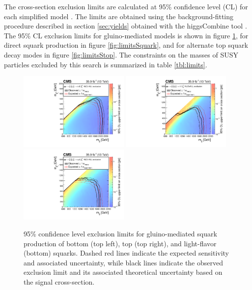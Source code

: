 The cross-section exclusion limits are calculated at 95\% confidence level (CL) for each simplified model \cite{0954-3899-28-10-313, Junk:1999kv, Cowan:2010js}. The limits are obtained using the background-fitting procedure described in section \ref{sec:yields} obtained with the higgsCombine tool \cite{CMS-NOTE-2011-005}. The 95\% CL exclusion limits for gluino-mediated models is shown in figure \ref{fig:limitsGluino}, for direct squark production in figure \ref{fig:limitsSquark}, and for alternate top squark decay modes in figure \ref{fig:limitsStop}. The constraints on the masses of SUSY particles excluded by this search is summarized in table \ref{tbl:limits}.
\begin{figure}
	\centering
	\includegraphics[width=0.48\textwidth]{results/figs/interpretations/T1bbbb_35p9ifb_Moriond2017_Mar07_XSEC}
	\includegraphics[width=0.48\textwidth]{results/figs/interpretations/T1tttt_35p9ifb_Moriond2017_Mar07_XSEC}
	\includegraphics[width=0.48\textwidth]{results/figs/interpretations/T1qqqq_35p9ifb_Moriond2017_Mar07_XSEC}
	\renewcommand{\baselinestretch}{1.0}
	\caption[95\% confidence level exclusion limits for gluino-mediated squark production of bottom (top left), top (top right), and light-flavor (bottom) squarks.]{95\% confidence level exclusion limits for gluino-mediated squark production of bottom (top left), top (top right), and light-flavor (bottom) squarks. Dashed red lines indicate the expected sensitivity and associated uncertainty, while black lines indicate the observed exclusion limit and its associated theoretical uncertainty based on the signal cross-section.}
	\label{fig:limitsGluino}
\end{figure}
